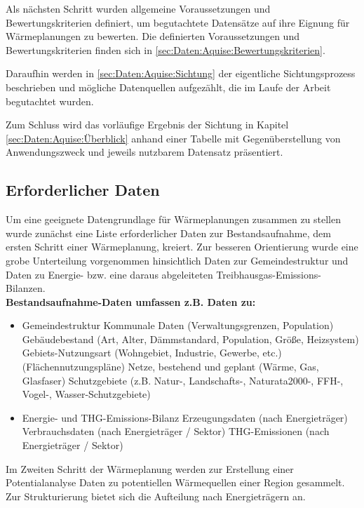 		Als nächsten Schritt wurden allgemeine Voraussetzungen und Bewertungskriterien definiert, um begutachtete Datensätze auf ihre Eignung für Wärmeplanungen zu bewerten. Die definierten Voraussetzungen und Bewertungskriterien finden sich in \autoref{sec:Daten:Aquise:Bewertungskriterien}.
		
		Daraufhin werden in \autoref{sec:Daten:Aquise:Sichtung} der eigentliche Sichtungsprozess beschrieben und mögliche Datenquellen aufgezählt, die im Laufe der Arbeit begutachtet wurden. 
		
		Zum Schluss wird das vorläufige Ergebnis der Sichtung in Kapitel \autoref{sec:Daten:Aquise:Überblick} anhand einer Tabelle mit Gegenüberstellung von Anwendungszweck und jeweils nutzbarem Datensatz präsentiert. 
		
		\subsection{Erforderlicher Daten}
		\label{sec:Daten:Aquise:Erforderliche_Daten}
			Um eine geeignete Datengrundlage für Wärmeplanungen zusammen zu stellen wurde zunächst eine Liste erforderlicher Daten zur Bestandsaufnahme, dem ersten Schritt einer Wärmeplanung, kreiert. Zur besseren Orientierung wurde eine grobe Unterteilung vorgenommen hinsichtlich Daten zur Gemeindestruktur und Daten zu Energie- bzw. eine daraus abgeleiteten Treibhausgas-Emissions-Bilanzen. \\
			
			\textbf{Bestandsaufnahme-Daten umfassen z.B. Daten zu:}
			\begin{itemize}
				\item Gemeindestruktur
				\subitem Kommunale Daten (Verwaltungsgrenzen, Population)
				\subitem Gebäudebestand (Art, Alter, Dämmstandard, Population, Größe, Heizsystem)
				\subitem Gebiets-Nutzungsart (Wohngebiet, Industrie, Gewerbe, etc.) (Flächennutzungspläne)
				\subitem Netze, bestehend und geplant (Wärme, Gas, Glasfaser)
				\subitem Schutzgebiete (z.B. Natur-, Landschafts-, Naturata2000-, FFH-, Vogel-, Wasser-Schutzgebiete)
				\item Energie- und THG-Emissions-Bilanz
				\subitem Erzeugungsdaten (nach Energieträger)
				\subitem Verbrauchsdaten (nach Energieträger / Sektor)
				\subitem THG-Emissionen (nach Energieträger / Sektor)
			\end{itemize}
			
			Im Zweiten Schritt der Wärmeplanung werden zur Erstellung einer Potentialanalyse Daten zu potentiellen Wärmequellen einer Region gesammelt. Zur Strukturierung bietet sich die Aufteilung nach Energieträgern an. \\
			
